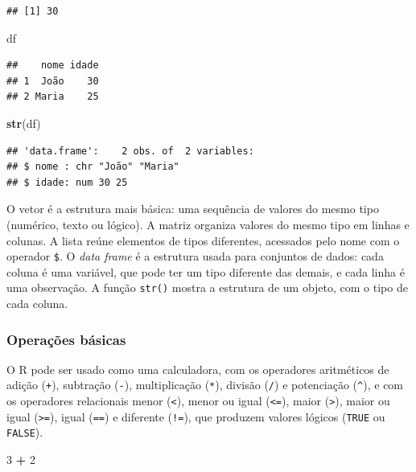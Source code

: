 \documentclass[
]{book}
\newenvironment{Shaded}{\begin{snugshade}}{\end{snugshade}}
\newcommand{\DecValTok}[1]{\textcolor[rgb]{0.00,0.00,0.81}{#1}}
\newcommand{\FunctionTok}[1]{\textcolor[rgb]{0.13,0.29,0.53}{\textbf{#1}}}
\newcommand{\NormalTok}[1]{#1}
\newcommand{\SpecialCharTok}[1]{\textcolor[rgb]{0.81,0.36,0.00}{\textbf{#1}}}
\begin{document}
\begin{verbatim}
## [1] 30
\end{verbatim}

\begin{Shaded}
\begin{Highlighting}[]
\NormalTok{df}
\end{Highlighting}
\end{Shaded}

\begin{verbatim}
##    nome idade
## 1  João    30
## 2 Maria    25
\end{verbatim}

\begin{Shaded}
\begin{Highlighting}[]
\FunctionTok{str}\NormalTok{(df)}
\end{Highlighting}
\end{Shaded}

\begin{verbatim}
## 'data.frame':    2 obs. of  2 variables:
## $ nome : chr "João" "Maria"
## $ idade: num 30 25
\end{verbatim}

O vetor é a estrutura mais básica: uma sequência de valores do mesmo tipo (numérico, texto ou lógico). A matriz organiza valores do mesmo tipo em linhas e colunas. A lista reúne elementos de tipos diferentes, acessados pelo nome com o operador \texttt{\$}. O \emph{data frame} é a estrutura usada para conjuntos de dados: cada coluna é uma variável, que pode ter um tipo diferente das demais, e cada linha é uma observação. A função \texttt{str()} mostra a estrutura de um objeto, com o tipo de cada coluna.

\subsubsection{Operações básicas}\label{operauxe7uxf5es-buxe1sicas}

O R pode ser usado como uma calculadora, com os operadores aritméticos de adição (\texttt{+}), subtração (\texttt{-}), multiplicação (\texttt{*}), divisão (\texttt{/}) e potenciação (\texttt{\^{}}), e com os operadores relacionais menor (\texttt{\textless{}}), menor ou igual (\texttt{\textless{}=}), maior (\texttt{\textgreater{}}), maior ou igual (\texttt{\textgreater{}=}), igual (\texttt{==}) e diferente (\texttt{!=}), que produzem valores lógicos (\texttt{TRUE} ou \texttt{FALSE}).

\begin{Shaded}
\begin{Highlighting}[]
\DecValTok{3} \SpecialCharTok{+} \DecValTok{2}
\end{Highlighting}
\end{Shaded}
\end{document}
